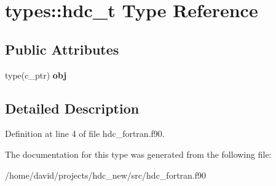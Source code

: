 \hypertarget{a00008}{}\section{types\+:\+:hdc\+\_\+t Type Reference}
\label{a00008}
\subsection*{Public Attributes}
\begin{DoxyCompactItemize}
\item 
type(c\+\_\+ptr) {\bfseries obj}\hypertarget{a00008_a3d68238bd16580d6c092d8bafc20f1c7}{}\label{a00008_a3d68238bd16580d6c092d8bafc20f1c7}

\end{DoxyCompactItemize}


\subsection{Detailed Description}


Definition at line 4 of file hdc\+\_\+fortran.\+f90.



The documentation for this type was generated from the following file\+:\begin{DoxyCompactItemize}
\item 
/home/david/projects/hdc\+\_\+new/src/hdc\+\_\+fortran.\+f90\end{DoxyCompactItemize}
